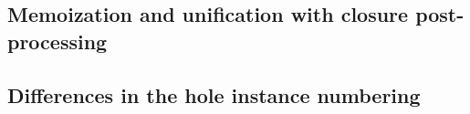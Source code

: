\subsection{Memoization and unification with closure post-processing}
\label{sec:renumbering_memoization}

\subsection{Differences in the hole instance numbering}
\label{sec:differences_numbering}


